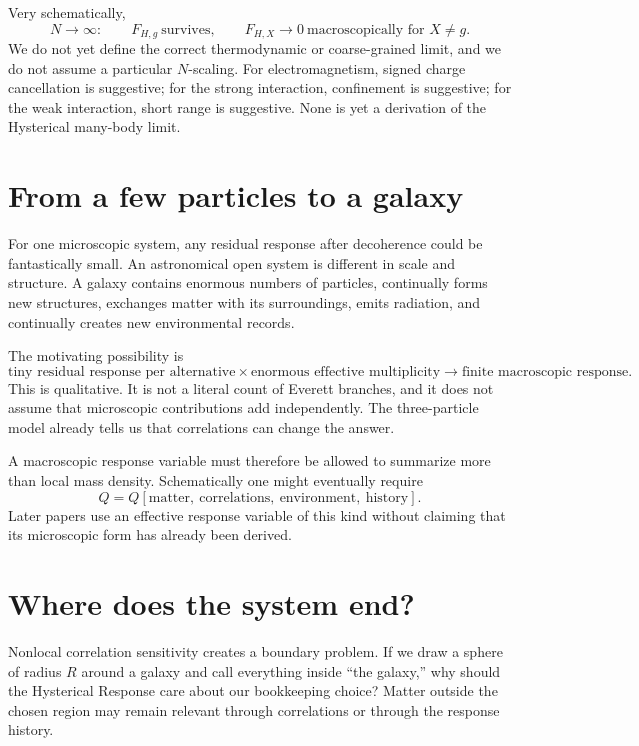 \documentclass[11pt]{article}
\begin{document}
Very schematically,
\begin{equation}
N\to\infty:\qquad F_{H,g}\ \text{survives},\qquad F_{H,X}\to0\ \text{macroscopically for }X\neq g.
\end{equation}
We do not yet define the correct thermodynamic or coarse-grained limit, and we do not assume a particular $N$-scaling. For electromagnetism, signed charge cancellation is suggestive; for the strong interaction, confinement is suggestive; for the weak interaction, short range is suggestive. None is yet a derivation of the Hysterical many-body limit.

\section{From a few particles to a galaxy}
For one microscopic system, any residual response after decoherence could be fantastically small. An astronomical open system is different in scale and structure. A galaxy contains enormous numbers of particles, continually forms new structures, exchanges matter with its surroundings, emits radiation, and continually creates new environmental records.

The motivating possibility is
\begin{equation}
\boxed{\text{tiny residual response per alternative}\times\text{enormous effective multiplicity}\longrightarrow\text{finite macroscopic response}.}
\end{equation}
This is qualitative. It is not a literal count of Everett branches, and it does not assume that microscopic contributions add independently. The three-particle model already tells us that correlations can change the answer.

A macroscopic response variable must therefore be allowed to summarize more than local mass density. Schematically one might eventually require
\begin{equation}
Q=Q[\text{matter},\ \text{correlations},\ \text{environment},\ \text{history}].
\end{equation}
Later papers use an effective response variable of this kind without claiming that its microscopic form has already been derived.

\section{Where does the system end?}
Nonlocal correlation sensitivity creates a boundary problem. If we draw a sphere of radius $R$ around a galaxy and call everything inside ``the galaxy,'' why should the Hysterical Response care about our bookkeeping choice? Matter outside the chosen region may remain relevant through correlations or through the response history.
\end{document}
